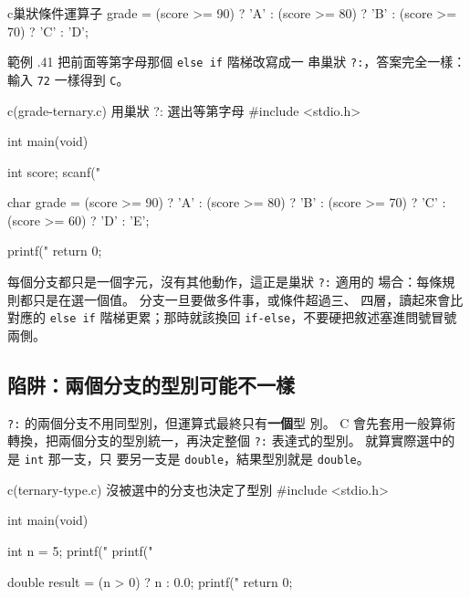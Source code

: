 \begin{code}{c}{巢狀條件運算子}
grade = (score >= 90) ? 'A' :
        (score >= 80) ? 'B' :
        (score >= 70) ? 'C' : 'D';
\end{code}

範例 \thechapter.41 把前面等第字母那個 \texttt{else if} 階梯改寫成一
串巢狀 \texttt{?:}，答案完全一樣：輸入 \texttt{72} 一樣得到
\texttt{C}。

\begin{example}{c}{(grade-ternary.c) 用巢狀 ?: 選出等第字母}
#include <stdio.h>

int main(void) {
    int score;
    scanf("%

    char grade = (score >= 90) ? 'A' :
                 (score >= 80) ? 'B' :
                 (score >= 70) ? 'C' :
                 (score >= 60) ? 'D' : 'E';

    printf("%
    return 0;
}
\end{example}


每個分支都只是一個字元，沒有其他動作，這正是巢狀 \texttt{?:} 適用的
場合：每條規則都只是在選一個值。 分支一旦要做多件事，或條件超過三、
四層，讀起來會比對應的 \texttt{else if} 階梯更累；那時就該換回
\texttt{if-else}，不要硬把敘述塞進問號冒號兩側。

\subsection{陷阱：兩個分支的型別可能不一樣}

\texttt{?:} 的兩個分支不用同型別，但運算式最終只有\textbf{一個}型
別。 C 會先套用一般算術轉換，把兩個分支的型別統一，再決定整個
\texttt{?:} 表達式的型別。 就算實際選中的是 \texttt{int} 那一支，只
要另一支是 \texttt{double}，結果型別就是 \texttt{double}。

\begin{example}{c}{(ternary-type.c) 沒被選中的分支也決定了型別}
#include <stdio.h>

int main(void) {
    int n = 5;
    printf("%
    printf("%

    double result = (n > 0) ? n : 0.0;
    printf("%
    return 0;
}
\end{example}


